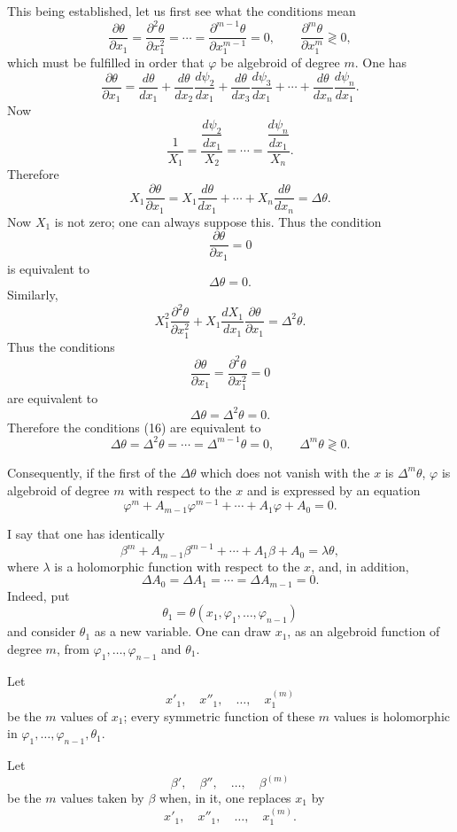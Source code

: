 \documentclass[11pt]{article}
\begin{document}
This being established, let us first see what the conditions mean
\begin{equation*}\tag{16}
\frac{\partial\theta}{\partial x_1}
=\frac{\partial^2\theta}{\partial x_1^2}
=\cdots=
\frac{\partial^{m-1}\theta}{\partial x_1^{m-1}}=0,
\qquad
\frac{\partial^m\theta}{\partial x_1^m}\gtrless0,
\end{equation*}
which must be fulfilled in order that $\varphi$ be algebroid of degree $m$. One has
\[
\frac{\partial\theta}{\partial x_1}
=
\frac{d\theta}{dx_1}
+\frac{d\theta}{dx_2}\frac{d\psi_2}{dx_1}
+\frac{d\theta}{dx_3}\frac{d\psi_3}{dx_1}
+\cdots+
\frac{d\theta}{dx_n}\frac{d\psi_n}{dx_1}.
\]
Now
\[
\frac{1}{X_1}
=
\frac{\dfrac{d\psi_2}{dx_1}}{X_2}
=\cdots=
\frac{\dfrac{d\psi_n}{dx_1}}{X_n}.
\]
Therefore
\[
X_1\frac{\partial\theta}{\partial x_1}
=
X_1\frac{d\theta}{dx_1}+\cdots+X_n\frac{d\theta}{dx_n}
=\Delta\theta.
\]
Now $X_1$ is not zero; one can always suppose this. Thus the condition
\[
\frac{\partial\theta}{\partial x_1}=0
\]
is equivalent to
\[
\Delta\theta=0.
\]
Similarly,
\[
X_1^2\frac{\partial^2\theta}{\partial x_1^2}
+X_1\frac{dX_1}{dx_1}\frac{\partial\theta}{\partial x_1}
=\Delta^2\theta.
\]
Thus the conditions
\[
\frac{\partial\theta}{\partial x_1}
=
\frac{\partial^2\theta}{\partial x_1^2}
=0
\]
are equivalent to
\[
\Delta\theta=\Delta^2\theta=0.
\]
Therefore the conditions (16) are equivalent to
\[
\Delta\theta=\Delta^2\theta=\cdots=\Delta^{m-1}\theta=0,
\qquad
\Delta^m\theta\gtrless0.
\]

Consequently, if the first of the $\Delta\theta$ which does not vanish with the $x$ is $\Delta^m\theta$, $\varphi$ is algebroid of degree $m$ with respect to the $x$ and is expressed by an equation
\[
\varphi^m+A_{m-1}\varphi^{m-1}+\cdots+A_1\varphi+A_0=0.
\]

I say that one has identically
\[
\beta^m+A_{m-1}\beta^{m-1}+\cdots+A_1\beta+A_0=\lambda\theta,
\]
where $\lambda$ is a holomorphic function with respect to the $x$, and, in addition,
\[
\Delta A_0=\Delta A_1=\cdots=\Delta A_{m-1}=0.
\]
Indeed, put
\[
\theta_1=\theta(x_1,\varphi_1,\ldots,\varphi_{n-1})
\]
and consider $\theta_1$ as a new variable. One can draw $x_1$, as an algebroid function of degree $m$, from $\varphi_1,\ldots,\varphi_{n-1}$ and $\theta_1$.

Let
\[
x'_1,\quad x''_1,\quad \ldots,\quad x_1^{(m)}
\]
be the $m$ values of $x_1$; every symmetric function of these $m$ values is holomorphic in $\varphi_1,\ldots,\varphi_{n-1},\theta_1$.

Let
\[
\beta',\quad \beta'',\quad \ldots,\quad \beta^{(m)}
\]
be the $m$ values taken by $\beta$ when, in it, one replaces $x_1$ by
\[
x'_1,\quad x''_1,\quad \ldots,\quad x_1^{(m)}.
\]
\end{document}
